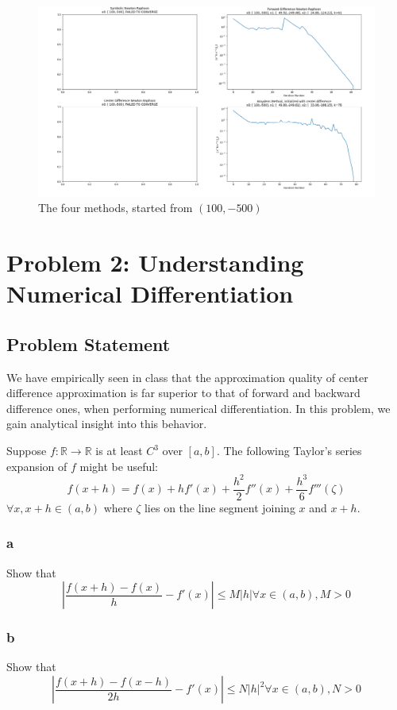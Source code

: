 \documentclass[11pt]{report}
\theoremstyle{definition}
\begin{document}
\begin{figure}
	\centering
	\includegraphics[width=1.25\textwidth, angle=90]{Figure_4.png}
	\caption{The four methods, started from $(100, -500)$}
\end{figure}


\newpage
\section*{Problem 2: Understanding Numerical Differentiation}
\subsection*{Problem Statement}
We have empirically seen in class that the approximation quality of center
difference approximation is far superior to that of forward and backward
difference ones, when performing numerical differentiation. In this problem, we
gain analytical insight into this behavior.

Suppose $f : \mathbb{R}\rightarrow\mathbb{R}$ is at least $C^3$ over $[a,b]$. The following
Taylor's series expansion of $f$ might be useful:
\[
	f(x+h) = f(x) + hf'(x) + \frac{h^2}{2}f''(x)+\frac{h^3}{6}f'''(\zeta)
\]
$\forall x, x+h\in(a,b)$ where $\zeta$ lies on the line segment joining $x$ and $x+h$.

\subsubsection*{a}
Show that
\[
	\left|
	\frac{f(x+h)-f(x)}{h}-f'(x)
	\right|
	\leq M|h|
	\forall x\in(a,b), M>0
\]

\subsubsection*{b}
Show that
\[
	\left|
	\frac{f(x+h)-f(x-h)}{2h}-f'(x)
	\right|
	\leq N|h|^2
	\forall x\in(a,b), N>0
\]
\end{document}

